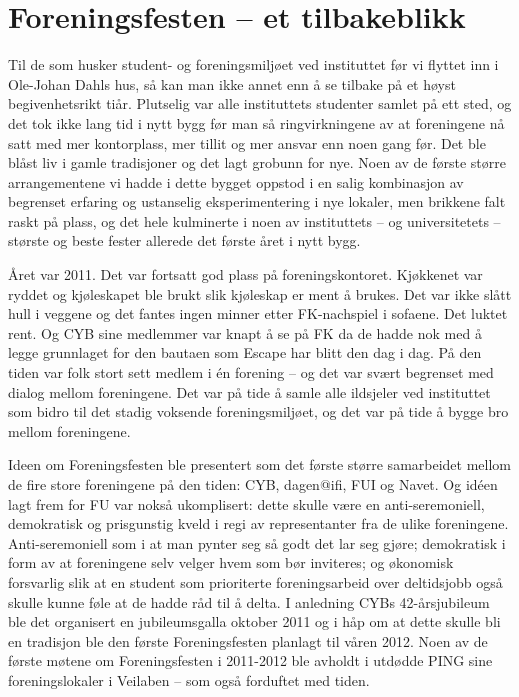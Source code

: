 \chapter[Foreningsfesten]{Foreningsfesten – et tilbakeblikk}

\author{Skrevet av Joshi}

Til de som husker student- og foreningsmiljøet ved instituttet før vi flyttet inn i Ole-Johan Dahls hus, så kan man ikke annet enn å se tilbake på et høyst begivenhetsrikt tiår. Plutselig var alle instituttets studenter samlet på ett sted, og det tok ikke lang tid i nytt bygg før man så ringvirkningene av at foreningene nå satt med mer kontorplass, mer tillit og mer ansvar enn noen gang før. Det ble blåst liv i gamle tradisjoner og det lagt grobunn for nye. Noen av de første større arrangementene vi hadde i dette bygget oppstod i en salig kombinasjon av begrenset erfaring og ustanselig eksperimentering i nye lokaler, men brikkene falt raskt på plass, og det hele kulminerte i noen av instituttets – og universitetets – største og beste fester allerede det første året i nytt bygg.

Året var 2011. Det var fortsatt god plass på foreningskontoret. Kjøkkenet var ryddet og kjøleskapet ble brukt slik kjøleskap er ment å brukes. Det var ikke slått hull i veggene og det fantes ingen minner etter FK-nachspiel i sofaene. Det luktet rent. Og CYB sine medlemmer var knapt å se på FK da de hadde nok med å legge grunnlaget for den bautaen som Escape har blitt den dag i dag. På den tiden var folk stort sett medlem i én forening – og det var svært begrenset med dialog mellom foreningene. Det var på tide å samle alle ildsjeler ved instituttet som bidro til det stadig voksende foreningsmiljøet, og det var på tide å bygge bro mellom foreningene.

Ideen om Foreningsfesten ble presentert som det første større samarbeidet mellom de fire store foreningene på den tiden: CYB, dagen@ifi, FUI og Navet. Og idéen lagt frem for FU var nokså ukomplisert: dette skulle være en anti-seremoniell, demokratisk og prisgunstig kveld i regi av representanter fra de ulike foreningene. Anti-seremoniell som i at man pynter seg så godt det lar seg gjøre; demokratisk i form av at foreningene selv velger hvem som bør inviteres; og økonomisk forsvarlig slik at en student som prioriterte foreningsarbeid over deltidsjobb også skulle kunne føle at de hadde råd til å delta. I anledning CYBs 42-årsjubileum ble det organisert en jubileumsgalla oktober 2011 og i håp om at dette skulle bli en tradisjon ble den første Foreningsfesten planlagt til våren 2012. Noen av de første møtene om Foreningsfesten i 2011-2012 ble avholdt i utdødde PING sine foreningslokaler i Veilaben – som også forduftet med tiden.

